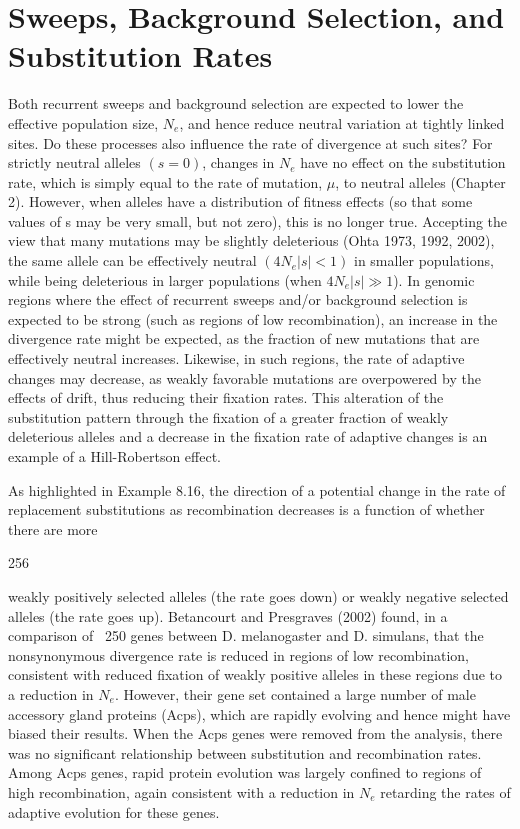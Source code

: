 \documentclass{article}
\begin{document}
\section{Sweeps, Background Selection, and Substitution Rates}
Both recurrent sweeps and background selection are expected to lower the effective population size,  $ N_e $, and hence reduce neutral variation at tightly linked sites. Do these processes also influence the rate of divergence at such sites? For strictly neutral alleles  $ (s = 0) $, changes in  $ N_e $ have no effect on the substitution rate, which is simply equal to the rate of mutation,  $ \mu $, to neutral alleles (Chapter 2). However, when alleles have a distribution of fitness effects (so that some values of s may be very small, but not zero), this is no longer true. Accepting the view that many mutations may be slightly deleterious (Ohta 1973, 1992, 2002), the same allele can be effectively neutral  $ (4N_e|s| < 1) $ in smaller populations, while being deleterious in larger populations (when  $ 4N_e|s| \gg 1 $). In genomic regions where the effect of recurrent sweeps and/or background selection is expected to be strong (such as regions of low recombination), an increase in the divergence rate might be expected, as the fraction of new mutations that are effectively neutral increases. Likewise, in such regions, the rate of adaptive changes may decrease, as weakly favorable mutations are overpowered by the effects of drift, thus reducing their fixation rates. This alteration of the substitution pattern through the fixation of a greater fraction of weakly deleterious alleles and a decrease in the fixation rate of adaptive changes is an example of a Hill-Robertson effect.

As highlighted in Example 8.16, the direction of a potential change in the rate of replacement substitutions as recombination decreases is a function of whether there are more

256

weakly positively selected alleles (the rate goes down) or weakly negative selected alleles (the rate goes up). Betancourt and Presgraves (2002) found, in a comparison of ~250 genes between D. melanogaster and D. simulans, that the nonsynonymous divergence rate is reduced in regions of low recombination, consistent with reduced fixation of weakly positive alleles in these regions due to a reduction in  $ N_{e} $. However, their gene set contained a large number of male accessory gland proteins (Acps), which are rapidly evolving and hence might have biased their results. When the Acps genes were removed from the analysis, there was no significant relationship between substitution and recombination rates. Among Acps genes, rapid protein evolution was largely confined to regions of high recombination, again consistent with a reduction in  $ N_{e} $ retarding the rates of adaptive evolution for these genes.
\end{document}

